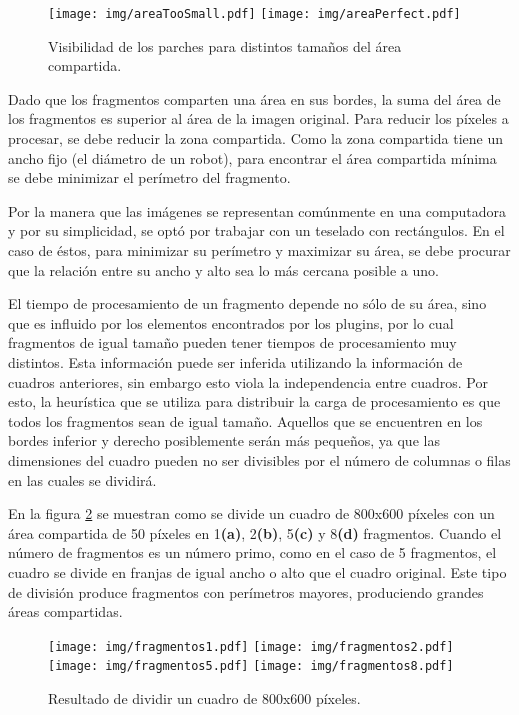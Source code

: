 \begin{figure}[!htb]

	\centering
	\texttt{[image: img/areaTooSmall.pdf]}
	\texttt{[image: img/areaPerfect.pdf]}

	\caption{Visibilidad de los parches para distintos tamaños del área
	compartida.}

	\label{areaCompartida}

\end{figure}

Dado que los fragmentos comparten una área en sus bordes, la suma del área de
los fragmentos es superior al área de la imagen original. Para reducir los
píxeles a procesar, se debe reducir la zona compartida. Como la zona compartida
tiene un ancho fijo (el diámetro de un robot), para encontrar el área compartida
mínima se debe minimizar el perímetro del fragmento.

Por la manera que las imágenes se representan comúnmente en una computadora y
por su simplicidad, se optó por trabajar con un teselado con rectángulos. En el
caso de éstos, para minimizar su perímetro y maximizar su área, se debe procurar
que la relación entre su ancho y alto sea lo más cercana posible a uno.

El tiempo de procesamiento de un fragmento depende no sólo de su área, sino que
es influido por los elementos encontrados por los plugins, por lo cual
fragmentos de igual tamaño pueden tener tiempos de procesamiento muy distintos.
Esta información puede ser inferida utilizando la información de cuadros
anteriores, sin embargo esto viola la independencia entre cuadros. Por esto, la
heurística que se utiliza para distribuir la carga de procesamiento es que todos
los fragmentos sean de igual tamaño. Aquellos que se encuentren en los bordes
inferior y derecho posiblemente serán más pequeños, ya que las dimensiones del
cuadro pueden no ser divisibles por el número de columnas o filas en las cuales
se dividirá.

En la figura \ref{fragmentos} se muestran como se divide un cuadro de 800x600
píxeles con un área compartida de 50 píxeles en 1\textbf{(a)}, 2\textbf{(b)},
5\textbf{(c)} y 8\textbf{(d)} fragmentos. Cuando el número de fragmentos es un
número primo, como en el caso de 5 fragmentos, el cuadro se divide en franjas de
igual ancho o alto que el cuadro original. Este tipo de división produce
fragmentos con perímetros mayores, produciendo grandes áreas compartidas.

\begin{figure}[!htb]

	\texttt{[image: img/fragmentos1.pdf]}
	\texttt{[image: img/fragmentos2.pdf]}
	\texttt{[image: img/fragmentos5.pdf]}
	\texttt{[image: img/fragmentos8.pdf]}
	\caption{Resultado de dividir un cuadro de 800x600 píxeles.}
	\label{fragmentos}

\end{figure}

